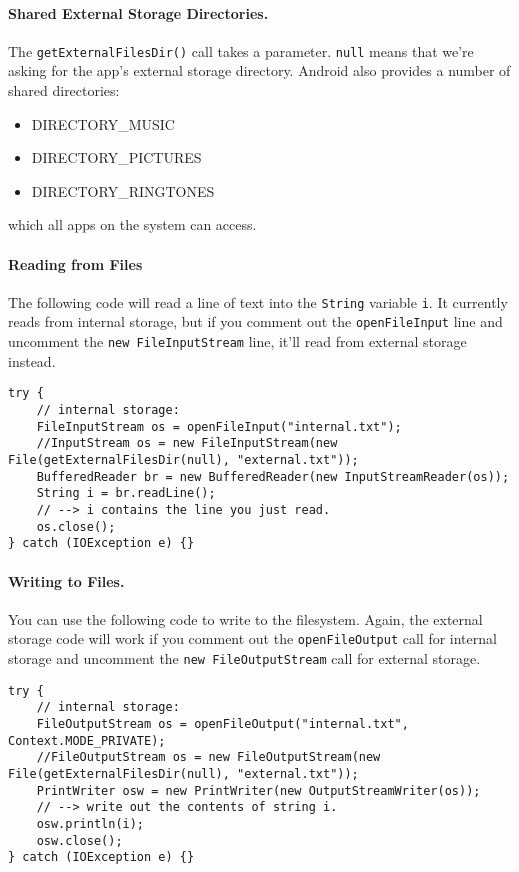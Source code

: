 \paragraph{Shared External Storage Directories.}
The {\tt getExternalFilesDir()} call takes a parameter.
{\tt null} means that we're asking for the app's external
storage directory. Android also provides a number of shared directories:
\begin{itemize}
\item DIRECTORY\_MUSIC
\item DIRECTORY\_PICTURES
\item DIRECTORY\_RINGTONES
\end{itemize}
which all apps on the system can access.


\paragraph{Reading from Files} The following code will read a line of text
into the {\tt String} variable {\tt i}. It currently reads from internal
storage, but if you comment out the {\tt openFileInput} line and uncomment
the {\tt new FileInputStream} line, it'll read from external storage instead.

\begin{lstlisting}[basicstyle=\scriptsize]
try {
    // internal storage: 
    FileInputStream os = openFileInput("internal.txt");
    //InputStream os = new FileInputStream(new File(getExternalFilesDir(null), "external.txt"));
    BufferedReader br = new BufferedReader(new InputStreamReader(os));
    String i = br.readLine();
    // --> i contains the line you just read.
    os.close();
} catch (IOException e) {}
\end{lstlisting}

\paragraph{Writing to Files.} You can use the following code to write to
the filesystem. Again, the external storage code will work if you
comment out the {\tt openFileOutput} call for internal storage and uncomment the 
{\tt new FileOutputStream} call for external storage.
\begin{lstlisting}[basicstyle=\scriptsize]
try {
    // internal storage:
    FileOutputStream os = openFileOutput("internal.txt", Context.MODE_PRIVATE);
    //FileOutputStream os = new FileOutputStream(new File(getExternalFilesDir(null), "external.txt"));
    PrintWriter osw = new PrintWriter(new OutputStreamWriter(os));
    // --> write out the contents of string i.
    osw.println(i);
    osw.close();
} catch (IOException e) {}
\end{lstlisting}


